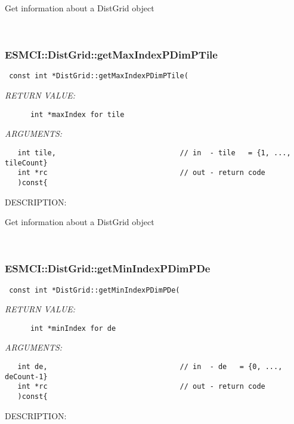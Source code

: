       Get information about a DistGrid object
   
 
\mbox{}\hrulefill\
 
\subsubsection [ESMCI::DistGrid::getMaxIndexPDimPTile] {ESMCI::DistGrid::getMaxIndexPDimPTile}


  
\begin{verbatim} const int *DistGrid::getMaxIndexPDimPTile(\end{verbatim}{\em RETURN VALUE:}
\begin{verbatim}      int *maxIndex for tile\end{verbatim}{\em ARGUMENTS:}
\begin{verbatim}   int tile,                             // in  - tile   = {1, ..., tileCount}
   int *rc                               // out - return code
   )const{\end{verbatim}
{\sf DESCRIPTION:\\ }


      Get information about a DistGrid object
   
 
\mbox{}\hrulefill\
 
\subsubsection [ESMCI::DistGrid::getMinIndexPDimPDe] {ESMCI::DistGrid::getMinIndexPDimPDe}


  
\begin{verbatim} const int *DistGrid::getMinIndexPDimPDe(\end{verbatim}{\em RETURN VALUE:}
\begin{verbatim}      int *minIndex for de\end{verbatim}{\em ARGUMENTS:}
\begin{verbatim}   int de,                               // in  - de   = {0, ..., deCount-1}
   int *rc                               // out - return code
   )const{\end{verbatim}
{\sf DESCRIPTION:\\ }



